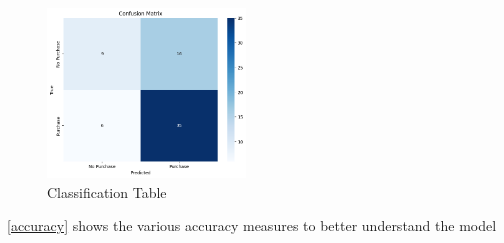 \documentclass[a4paper,10pt]{article}
\begin{document}
\begin{figure}[ht]
\centering
\includegraphics[height=4.5cm]{figures/confusion_matrix.png}
\caption{Classification Table}
\label{class_tab}
\end{figure}
\vspace{10pt}
\ref{accuracy} shows the various accuracy measures to better understand the model
\end{document}

